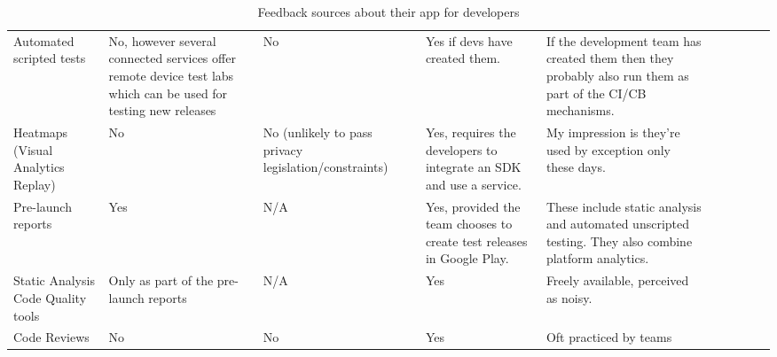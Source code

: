 \begin{table}[H]
\begin{adjustbox}{max width=\textwidth}
\begin{tabular}{p{2.7cm}p{3.12cm}p{3.7cm}p{3.17cm}p{3.17cm}p{2.7cm}p{3.12cm}p{3.7cm}p{3.17cm}p{3.17cm}}
\multicolumn{1}{p{2.7cm}}{\raggedright{\scriptsize Automated scripted tests }} & 
\multicolumn{1}{p{3.12cm}}{\raggedright{\scriptsize No, however several connected services offer remote device test labs which can be used for testing new releases\par}} & 
\multicolumn{1}{p{3.7cm}}{\raggedright{\scriptsize No}} & 
\multicolumn{1}{p{3.17cm}}{\raggedright{\scriptsize Yes if devs have created them.}} & 
\multicolumn{1}{p{3.17cm}}{{\scriptsize If the development team has created them then they probably also run them as part of the CI/CB mechanisms.\par}} \\ 

\multicolumn{1}{p{2.7cm}}{\raggedright{\scriptsize Heatmaps (Visual Analytics Replay)}} & 
\multicolumn{1}{p{3.12cm}}{\raggedright{\scriptsize No}} & 
\multicolumn{1}{p{3.7cm}}{\raggedright{\scriptsize No (unlikely to pass privacy legislation/constraints)}} & 
\multicolumn{1}{p{3.17cm}}{\raggedright{\scriptsize Yes, requires the developers to integrate an SDK and use a service.}} & 
\multicolumn{1}{p{3.17cm}}{\raggedright{\scriptsize My impression is they’re used by exception only these days.}} \\ 

\multicolumn{1}{p{2.7cm}}{\raggedright{\scriptsize Pre-launch reports}} & 
\multicolumn{1}{p{3.12cm}}{\raggedright{\scriptsize Yes}} & 
\multicolumn{1}{p{3.7cm}}{\raggedright{\scriptsize N/A}} & 
\multicolumn{1}{p{3.17cm}}{\raggedright{\scriptsize Yes, provided the team chooses to create test releases in Google Play.}} & 
\multicolumn{1}{p{3.17cm}}{\raggedright{\scriptsize These include static analysis and automated unscripted testing. They also combine platform analytics.\par}} \\ 

\multicolumn{1}{p{2.7cm}}{\raggedright{\scriptsize Static Analysis Code Quality tools}} & 
\multicolumn{1}{p{3.12cm}}{{\scriptsize Only as part of the pre-launch reports}} & 
\multicolumn{1}{p{3.7cm}}{\raggedright{\scriptsize N/A}} & 
\multicolumn{1}{p{3.17cm}}{\raggedright{\scriptsize Yes}} & 
\multicolumn{1}{p{3.17cm}}{\raggedright{\scriptsize Freely available, perceived as noisy.}} \\ 

\multicolumn{1}{p{2.7cm}}{\raggedright{\scriptsize Code Reviews}} & 
\multicolumn{1}{p{3.12cm}}{{\scriptsize No}} & 
\multicolumn{1}{p{3.7cm}}{\raggedright{\scriptsize No}} & 
\multicolumn{1}{p{3.17cm}}{\raggedright{\scriptsize Yes}} & 
\multicolumn{1}{p{3.17cm}}{\raggedright{\scriptsize Oft practiced by teams}} \\ 

\end{tabular}
\end{adjustbox}
\caption{Feedback sources about their app for developers}
\label{tab:feedback-sources-about-their-app-for-devs}
\end{table}
\vspace{2\baselineskip}
